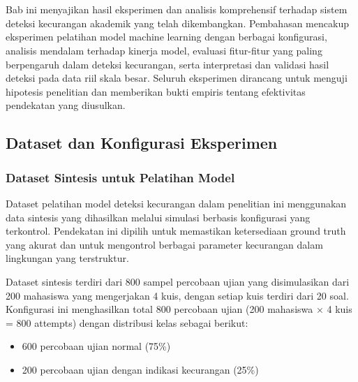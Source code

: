 
\chapter{\babEmpat}
\label{bab:4}

Bab ini menyajikan hasil eksperimen dan analisis komprehensif terhadap sistem deteksi kecurangan akademik yang telah dikembangkan. Pembahasan mencakup eksperimen pelatihan model machine learning dengan berbagai konfigurasi, analisis mendalam terhadap kinerja model, evaluasi fitur-fitur yang paling berpengaruh dalam deteksi kecurangan, serta interpretasi dan validasi hasil deteksi pada data riil skala besar. Seluruh eksperimen dirancang untuk menguji hipotesis penelitian dan memberikan bukti empiris tentang efektivitas pendekatan yang diusulkan.

\section{Dataset dan Konfigurasi Eksperimen}
\label{sec:datasetKonfigurasi}

\subsection{Dataset Sintesis untuk Pelatihan Model}
\label{subsec:datasetSintesis}

Dataset pelatihan model deteksi kecurangan dalam penelitian ini menggunakan data sintesis yang dihasilkan melalui simulasi berbasis konfigurasi yang terkontrol. Pendekatan ini dipilih untuk memastikan ketersediaan ground truth yang akurat dan untuk mengontrol berbagai parameter kecurangan dalam lingkungan yang terstruktur.

Dataset sintesis terdiri dari 800 sampel percobaan ujian yang disimulasikan dari 200 mahasiswa yang mengerjakan 4 kuis, dengan setiap kuis terdiri dari 20 soal. Konfigurasi ini menghasilkan total 800 percobaan ujian (200 mahasiswa $\times$ 4 kuis = 800 attempts) dengan distribusi kelas sebagai berikut:
\begin{itemize}
    \item 600 percobaan ujian normal (75\%)
    \item 200 percobaan ujian dengan indikasi kecurangan (25\%)
\end{itemize}

